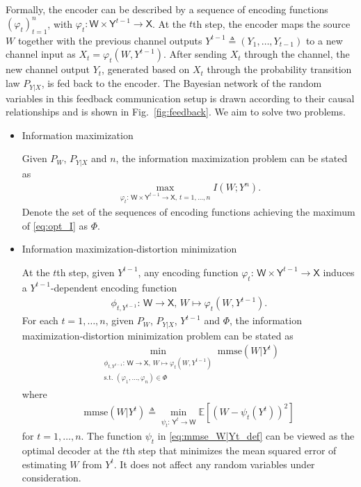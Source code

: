 \documentclass{article}
\newcommand{\E}{\mathbb{E}}
\def\sW{{\mathsf W}}
\def\sX{{\mathsf X}}
\def\sY{{\mathsf Y}}
\def\deq{\triangleq}
\begin{document}
Formally, the encoder can be described by a sequence of encoding functions $(\varphi_t)_{t=1}^n$, with $\varphi_t: \sW\times\sY^{t-1}\rightarrow\sX$.
At the $t$th step, the encoder maps the source $W$ together with the previous channel outputs $Y^{t-1}\deq(Y_1, \ldots, Y_{t-1})$ to a new channel input as $X_t=\varphi_t(W,Y^{t-1})$. After sending $X_t$ through the channel, the new channel output $Y_t$, generated based on $X_t$ through the probability transition law $P_{Y|X}$, is fed back to the encoder. 
The Bayesian network of the random variables in this feedback communication setup is drawn according to their causal relationships and is shown in Fig.~\ref{fig:feedback}.
We aim to solve %
two problems.
\begin{itemize}[leftmargin=*]
    \item Information maximization
    
Given $P_W$, $P_{Y|X}$ and $n$, the information maximization problem can be stated as
\begin{align}
    \max_{\varphi_t:\,\sW\times\sY^{t-1} \rightarrow \sX , \, t=1,\ldots,n} I(W; Y^n) . \label{eq:opt_I}
\end{align}
Denote the set of the sequences of encoding functions achieving the maximum of \eqref{eq:opt_I} as $\mathsf\Phi$. 

    \item Information maximization-distortion minimization

At the $t$th step, given $Y^{t-1}$, any encoding function $\varphi_t:\,\sW\times\sY^{t-1} \rightarrow \sX$ induces a $Y^{t-1}$-dependent encoding function 
\begin{align}
\phi_{t,Y^{t-1}}:\,\sW \rightarrow \sX, \, W\mapsto \varphi_t(W, Y^{t-1}) . \label{eq:Y-depend_phi}
\end{align}
For each $t=1,\ldots,n$, given $P_W$, $P_{Y|X}$, $Y^{t-1}$ and $\mathsf\Phi$, the information maximization-distortion minimization problem can be stated as
\begin{align}
    \min_{\substack{\phi_{t,Y^{t-1}}:\,\sW \rightarrow \sX , \, W\mapsto \varphi_t(W, Y^{t-1})\\ \text{s.t. } (\varphi_1, \ldots, \varphi_n)\in\mathsf\Phi}} \text{mmse}(W|Y^{t}) \label{eq:opt_mmse}
\end{align}
where 
\begin{align}
\text{mmse}(W|Y^{t}) \deq \min_{\psi_t:\,\sY^t\rightarrow\sW}\E[(W-\psi_t(Y^{t}))^2]    \label{eq:mmse_W|Yt_def}
\end{align}
for $t = 1, \ldots, n$.
The function $\psi_t$ in \eqref{eq:mmse_W|Yt_def} can be viewed as the optimal decoder at the $t$th step that minimizes the mean squared error of estimating $W$ from $Y^t$. It does not affect any random variables under consideration. 
\end{itemize}
\end{document}
